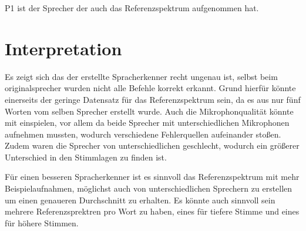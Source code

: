 P1 ist der Sprecher der auch das Referenzspektrum aufgenommen hat.


\section{Interpretation}
\label{chap:VERSUCH_2_INTERPRETATION}

Es zeigt sich das der erstellte Spracherkenner recht ungenau ist, selbst beim originalsprecher wurden nicht alle Befehle korrekt erkannt.
Grund hierfür könnte einerseits der geringe Datensatz für das Referenzspektrum sein, da es aus nur fünf Worten vom selben Sprecher erstellt wurde.
Auch die Mikrophonqualität könnte mit einspielen, vor allem da beide Sprecher mit unterschiedlichen Mikrophonen aufnehmen mussten, wodurch verschiedene Fehlerquellen aufeinander stoßen.
Zudem waren die Sprecher von unterschiedlichen geschlecht, wodurch ein größerer Unterschied in den Stimmlagen zu finden ist.

Für einen besseren Spracherkenner ist es sinnvoll das Referenzspektrum mit mehr Beispielaufnahmen, möglichst auch von unterschiedlichen Sprechern zu erstellen um einen genaueren Durchschnitt zu erhalten.
Es könnte auch sinnvoll sein mehrere Referenzsprektren pro Wort zu haben, eines für tiefere Stimme und eines für höhere Stimmen.

